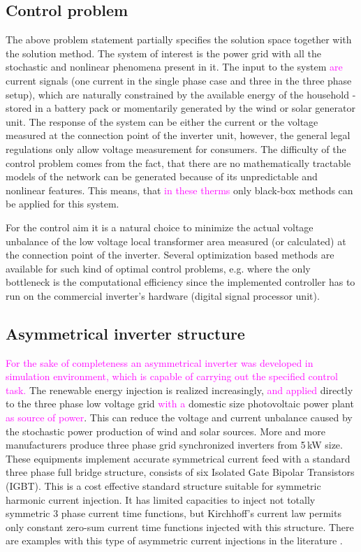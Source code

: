     \subsection{Control problem}

    The above problem statement partially specifies the solution space together with the solution method. The system of interest is the power grid with all the stochastic and nonlinear phenomena present in it. The input to the system \textcolor{magenta}{are} current signals (one current in the single phase case and three in the three phase setup), which are naturally constrained by the available energy of the household - stored in a battery pack or momentarily generated by the wind or solar generator unit. The response of the system can be either the current or the voltage measured at the connection point of the inverter unit, however, the general legal regulations only allow voltage measurement for consumers. The difficulty of the control problem comes from the fact, that there are no mathematically tractable models of the network can be generated because of its unpredictable and nonlinear features. This means, that \textcolor{magenta}{in these therms} only black-box methods can be applied for this system.

    For the control aim it is a natural choice to minimize the actual voltage unbalance of the low voltage local transformer area measured (or calculated) at the connection point of the inverter. Several optimization based methods are available for such kind of optimal control problems, e.g.  \cite{gorbe2012reduction} where the only bottleneck is the computational efficiency since the implemented controller has to run on the commercial inverter's hardware (digital signal processor unit).

    \subsection{Asymmetrical inverter structure}

    \textcolor{magenta}{For the sake of completeness an asymmetrical inverter was developed in simulation environment, which is capable of carrying out the specified control task.} The renewable energy injection is realized increasingly, \textcolor{magenta}{and applied} directly to the three phase low voltage grid  \textcolor{magenta}{with a} domestic size photovoltaic power plant \textcolor{magenta}{as source of power}. This can reduce the voltage and current unbalance caused by the stochastic power production of wind and solar sources. More and more manufacturers produce three phase grid synchronized inverters from 5\,kW size. These equipments implement accurate symmetrical current feed with a standard three phase full bridge structure, consists of six Isolated Gate Bipolar Transistors (IGBT). This is a cost effective standard structure suitable for symmetric harmonic current injection. It has limited capacities to inject not totally symmetric 3 phase current time functions, but Kirchhoff's current law permits only constant zero-sum current time functions injected with this structure. There are examples with this type of asymmetric current injections in the literature \cite{lee2009new}.

